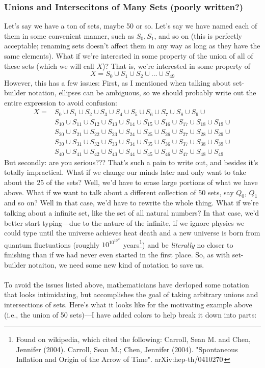 \documentclass[10pt]{article}
\theoremstyle{definition}
\begin{document}
\subsubsection{Unions and Intersecitons of Many Sets (poorly written?)}
Let's say we have a ton of sets, maybe 50 or so.  Let's say we have named each of them in some convenient manner, such as $S_0, S_1$, and so on (this is perfectly acceptable; renaming sets doesn't affect them in any way as long as they have the same elements).  What if we're interested in some property of the union of all of these sets (which we will call $X$)?  That is, we're interested in some property of
\[X = S_0\cup S_1\cup S_2 \cup \ldots \cup S_{49}\]
However, this has a few issues: First, as I mentioned when talking about set-builder notation, ellipses can be ambiguous, so we should probably write out the entire expression to avoid confusion:
\begin{align*}
X =&S_0\cup S_1\cup S_2 \cup S_3 \cup S_4 \cup S_5 \cup S_6 \cup S_7 \cup S_8 \cup S_9 \cup \\
&S_{10}\cup S_{11}\cup S_{12} \cup S_{13} \cup S_{14} \cup S_{15} \cup S_{16} \cup S_{17} \cup S_{18} \cup S_{19} \cup \\
&S_{20}\cup S_{21}\cup S_{22} \cup S_{23} \cup S_{24} \cup S_{25} \cup S_{26} \cup S_{27} \cup S_{28} \cup S_{29} \cup \\
&S_{30}\cup S_{31}\cup S_{32} \cup S_{33} \cup S_{34} \cup S_{35} \cup S_{36} \cup S_{37} \cup S_{38} \cup S_{39} \cup \\
&S_{40}\cup S_{41}\cup S_{42} \cup S_{43} \cup S_{44} \cup S_{45} \cup S_{46} \cup S_{47} \cup S_{48} \cup S_{49}
\end{align*}
But secondly: are you serious??? That's such a pain to write out, and besides it's totally impractical.  What if we change our minds later and only want to take about the 25 of the sets? Well, we'd have to erase large portions of what we have above.  What if we want to talk about a different collection of 50 sets, say $Q_0$, $Q_1$ and so on?  Well in that case, we'd have to rewrite the whole thing.  What if we're talking about a infinite set, like the set of all natural numbers?  In that case, we'd better start typing---due to the nature of the infinite, if we ignore physics we could type until the universe achieves heat death and a new universe is born from quantum fluctuations (roughly $\displaystyle 10^{10^{10^{56}}}$ years\footnote{Found on wikipedia, which cited the following: Carroll, Sean M. and Chen, Jennifer (2004). Carroll, Sean M.; Chen, Jennifer (2004). "Spontaneous Inflation and Origin of the Arrow of Time". arXiv:hep-th/0410270 }) and be \emph{literally} no closer to finishing than if we had never even started in the first place.  So, as with set-builder notaiton, we need some new kind of notation to save us.\\~\\  To avoid the issues listed above, mathematicians have devloped some notation that looks intimidating, but accomplishes the goal of taking arbitrary unions and intersections of sets.  Here's what it looks like for the motivating example above (i.e., the union of 50 sets)---I have added colors to help break it down into parts:
\end{document}
